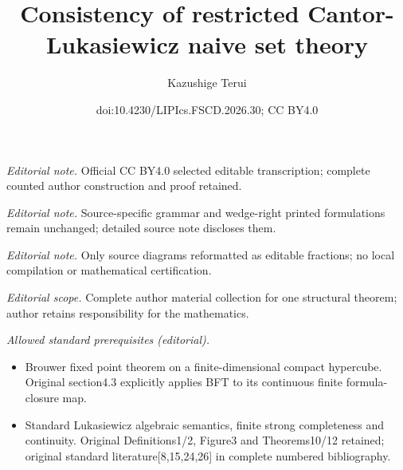 \documentclass[10pt,a4paper]{article}
\title{Consistency of restricted Cantor-Lukasiewicz naive set theory}
\author{Kazushige Terui}
\date{doi:10.4230/LIPIcs.FSCD.2026.30; CC BY4.0}
\begin{document}
\maketitle
\noindent\textit{Editorial note.} Official CC BY4.0 selected editable transcription; complete counted author construction and proof retained.\par\medskip
\noindent\textit{Editorial note.} Source-specific grammar and wedge-right printed formulations remain unchanged; detailed source note discloses them.\par\medskip
\noindent\textit{Editorial note.} Only source diagrams reformatted as editable fractions; no local compilation or mathematical certification.\par\medskip
\noindent\textit{Editorial scope.} Complete author material collection for one structural theorem; author retains responsibility for the mathematics.\par\medskip
\noindent\textit{Allowed standard prerequisites (editorial).}\begin{itemize}
\item Brouwer fixed point theorem on a finite-dimensional compact hypercube. Original section4.3 explicitly applies BFT to its continuous finite formula-closure map.
\item Standard Lukasiewicz algebraic semantics, finite strong completeness and continuity. Original Definitions1/2, Figure3 and Theorems10/12 retained; original standard literature[8,15,24,26] in complete numbered bibliography.
\end{itemize}\medskip
\end{document}
